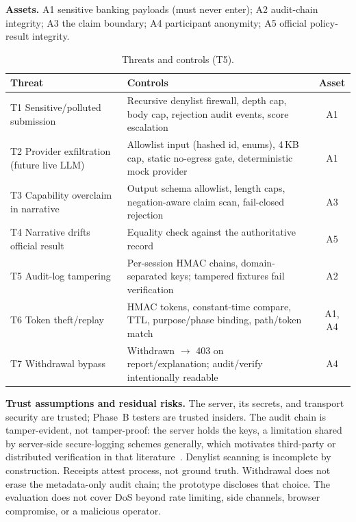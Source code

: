 \documentclass[conference]{IEEEtran}
\begin{document}
\textbf{Assets.} A1 sensitive banking payloads (must never enter); A2
audit-chain integrity; A3 the claim boundary; A4 participant anonymity; A5
official policy-result integrity.

\begin{table}[t]
\caption{Threats and controls (T5).}
\centering
\footnotesize
\begin{tabular}{p{4.0cm}p{10.0cm}c}
\toprule
Threat & Controls & Asset \\
\midrule
T1 Sensitive/polluted submission & Recursive denylist firewall, depth cap, body
cap, rejection audit events, score escalation & A1 \\
T2 Provider exfiltration (future live LLM) & Allowlist input (hashed id, enums),
4\,KB cap, static no-egress gate, deterministic mock provider & A1 \\
T3 Capability overclaim in narrative & Output schema allowlist, length caps,
negation-aware claim scan, fail-closed rejection & A3 \\
T4 Narrative drifts official result & Equality check against the authoritative
record & A5 \\
T5 Audit-log tampering & Per-session HMAC chains, domain-separated keys;
tampered fixtures fail verification & A2 \\
T6 Token theft/replay & HMAC tokens, constant-time compare, TTL, purpose/phase
binding, path/token match & A1, A4 \\
T7 Withdrawal bypass & Withdrawn $\rightarrow$ 403 on report/explanation;
audit/verify intentionally readable & A4 \\
\bottomrule
\end{tabular}
\label{tab:threats}
\end{table}

\noindent\textbf{Trust assumptions and residual risks.} The server, its secrets,
and transport security are trusted; Phase~B testers are trusted insiders. The
audit chain is tamper-evident, not tamper-proof: the server holds the keys, a
limitation shared by server-side secure-logging schemes generally, which
motivates third-party or distributed verification in that
literature~\cite{sree2019secure,ali2022bcals}. Denylist scanning is incomplete
by construction. Receipts attest process, not ground truth. Withdrawal does not
erase the metadata-only audit chain; the prototype discloses that choice. The
evaluation does not cover DoS beyond rate limiting, side channels, browser
compromise, or a malicious operator.

\end{document}
